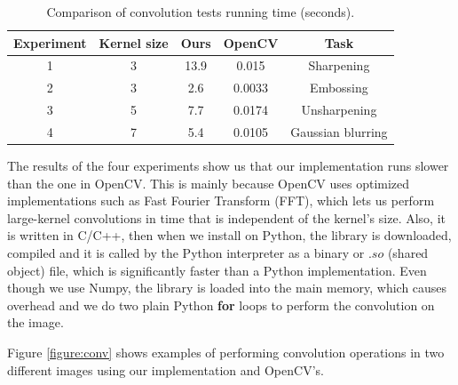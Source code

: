 \documentclass[]{IEEEtran}
\begin{document}
    \begin{table}[h]
    \centering
        \begin{tabular}{|c c c c c|} 
        \hline
            Experiment & Kernel size & Ours & OpenCV & Task\\ 
            \hline\hline
            1 & 3 & 13.9 & 0.015 & Sharpening\\ 
            \hline
            2 & 3 & 2.6 & 0.0033 & Embossing\\
            \hline
            3 & 5 & 7.7 & 0.0174 & Unsharpening\\
            \hline
            4 & 7 & 5.4 & 0.0105 & Gaussian blurring\\
        \hline
        \end{tabular}
        \vspace{1pt}
        \caption{Comparison of convolution tests running time (seconds).}
        \label{table:1}
        \vspace{-5pt}
    \end{table}
    
    The results of the four experiments show us that our implementation runs slower than the one in OpenCV. This is mainly because OpenCV uses optimized implementations such as Fast Fourier Transform (FFT), which lets us perform large-kernel convolutions in time that is independent of the kernel's size\cite{b3}. Also, it is written in C/C++, then when we install on Python, the library is downloaded, compiled and it is called by the Python interpreter as a binary or $.so$ (shared object) file, which is significantly faster than a Python implementation. Even though we use Numpy, the library is loaded into the main memory, which causes overhead and we do two plain Python \textbf{for} loops to perform the convolution on the image.
    
    Figure \ref{figure:conv} shows examples of performing convolution operations in two different images using our implementation and OpenCV's.
    
\end{document}
